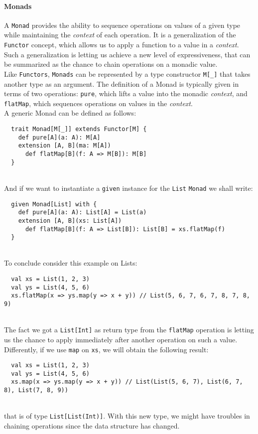 \paragraph{Monads}
A \texttt{Monad} provides the ability to sequence operations on values of a given type while maintaining the \textit{context} of each operation.
It is a generalization of the \texttt{Functor} concept, which allows us to apply a function to a value in a \textit{context}.
Such a generalization is letting us achieve a new level of expressiveness, that can be summarized as the chance to chain operations on a monadic value.\\
Like \texttt{Functors}, \texttt{Monads} can be represented by a type constructor \texttt{M[\_]} that takes another type as an argument.
The definition of a Monad is typically given in terms of two operations: \texttt{pure}, which lifts a value into the monadic \textit{context}, and \texttt{flatMap}, which sequences operations on values in the \textit{context}.\\
A generic Monad can be defined as follows:
\begin{verbatim}
  trait Monad[M[_]] extends Functor[M] {
    def pure[A](a: A): M[A]
    extension [A, B](ma: M[A])
      def flatMap[B](f: A => M[B]): M[B]
  }
\end{verbatim}\mbox{}\\
And if we want to instantiate a \texttt{given} instance for the \texttt{List} \texttt{Monad} we shall write:
\begin{verbatim}
  given Monad[List] with {
    def pure[A](a: A): List[A] = List(a)
    extension [A, B](xs: List[A])
      def flatMap[B](f: A => List[B]): List[B] = xs.flatMap(f)
  }
\end{verbatim}\mbox{}\\
To conclude consider this example on Lists:
\begin{verbatim}
  val xs = List(1, 2, 3)
  val ys = List(4, 5, 6)
  xs.flatMap(x => ys.map(y => x + y)) // List(5, 6, 7, 6, 7, 8, 7, 8, 9)
\end{verbatim}\mbox{}\\
The fact we got a \texttt{List[Int]} as return type from the \texttt{flatMap} operation is letting us the chance to apply immediately after another operation on such a value.
Differently, if we use \texttt{map} on \texttt{xs}, we will obtain the following result:
\begin{verbatim}
  val xs = List(1, 2, 3)
  val ys = List(4, 5, 6)
  xs.map(x => ys.map(y => x + y)) // List(List(5, 6, 7), List(6, 7, 8), List(7, 8, 9))
\end{verbatim}\mbox{}\\
that is of type \texttt{List[List(Int)]}. With this new type, we might have troubles in chaining operations since the data structure has changed.

